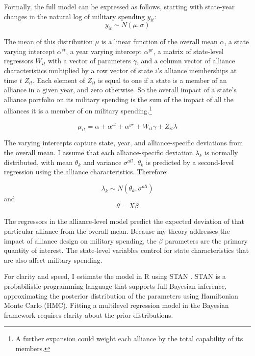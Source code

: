 \documentclass[12pt]{article}
\begin{document}
Formally, the full model can be expressed as follows, starting with state-year changes in the natural log of military spending $y_{it}$:
\begin{equation}
y_{it} \sim N( \mu, \sigma) 
\end{equation}

The mean of this distribution $\mu$ is a linear function of the overall mean $\alpha$, a state varying intercept $\alpha^{st}$, a year varying intercept $\alpha^{yr}$, a matrix of state-level regressors $W_{it}$ with a vector of parameters $\gamma$, and a column vector of alliance characteristics multiplied by a row vector of state $i$'s alliance memberships at time $t$ $Z_{it}$. Each element of $Z_{it}$ is equal to one if a state is a member of an alliance in a given year, and zero otherwise. So the overall impact of a state's alliance portfolio on its military spending is the sum of the impact of all the alliances it is a member of on military spending.\footnote{A further expansion could weight each alliance by the total capability of its members.} 

\begin{equation}
\mu_{it} = \alpha + \alpha^{st} + \alpha^{yr} + W_{it} \gamma + Z_{it} \lambda 
\end{equation}

The varying intercepts capture state, year, and alliance-specific deviations from the overall mean. I assume that each alliance-specific deviation $\lambda_k$ is normally distributed, with mean $\theta_k$ and variance $\sigma^{all}$. $\theta_k$ is predicted by a second-level regression using the alliance characteristics. Therefore:

\begin{equation}
\lambda_k \sim N(\theta_k , \sigma^{all})
\end{equation} 
and 
\begin{equation}
\theta = X \beta
\end{equation}

The regressors in the alliance-level model predict the expected deviation of that particular alliance from the overall mean. Because my theory addresses the impact of alliance design on military spending, the $\beta$ parameters are the primary quantity of interest. The state-level variables control for state characteristics that are also affect military spending. 

For clarity and speed, I estimate the model in \textsf{R} using STAN \citep{Carpenteretal2016}. STAN is a probabilistic programming language that supports full Bayesian inference, approximating the posterior distribution of the parameters using Hamiltonian Monte Carlo (HMC). Fitting a multilevel regression model in the Bayesian framework requires clarity about the prior distributions. 
\end{document}
